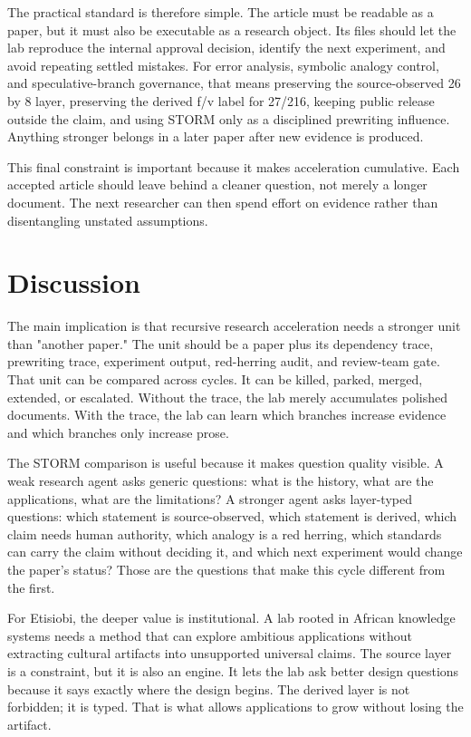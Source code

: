 \documentclass[sigconf,nonacm]{acmart}
\begin{document}
The practical standard is therefore simple. The article must be readable as a
paper, but it must also be executable as a research object. Its files should let
the lab reproduce the internal approval decision, identify the next experiment,
and avoid repeating settled mistakes. For error analysis, symbolic analogy control, and speculative-branch governance, that means preserving the
source-observed 26 by 8 layer, preserving the derived f/v label for 27/216,
keeping public release outside the claim, and using STORM only as a disciplined
prewriting influence. Anything stronger belongs in a later paper after new
evidence is produced.

This final constraint is important because it makes acceleration cumulative.
Each accepted article should leave behind a cleaner question, not merely a
longer document. The next researcher can then spend effort on evidence rather
than disentangling unstated assumptions.


\section{Discussion}
The main implication is that recursive research acceleration needs a stronger
unit than "another paper." The unit should be a paper plus its dependency trace,
prewriting trace, experiment output, red-herring audit, and review-team gate.
That unit can be compared across cycles. It can be killed, parked, merged,
extended, or escalated. Without the trace, the lab merely accumulates polished
documents. With the trace, the lab can learn which branches increase evidence
and which branches only increase prose.

The STORM comparison is useful because it makes question quality visible. A
weak research agent asks generic questions: what is the history, what are the
applications, what are the limitations? A stronger agent asks layer-typed
questions: which statement is source-observed, which statement is derived, which
claim needs human authority, which analogy is a red herring, which standards can
carry the claim without deciding it, and which next experiment would change the
paper's status? Those are the questions that make this cycle different from the
first.

For Etisiobi, the deeper value is institutional. A lab rooted in African
knowledge systems needs a method that can explore ambitious applications
without extracting cultural artifacts into unsupported universal claims. The
source layer is a constraint, but it is also an engine. It lets the lab ask
better design questions because it says exactly where the design begins. The
derived layer is not forbidden; it is typed. That is what allows applications to
grow without losing the artifact.
\end{document}
